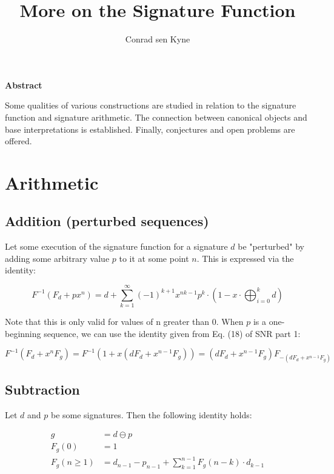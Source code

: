 \documentclass{article}
\title{\Large More on the Signature Function}
\author{Conrad sen Kyne}
\date{}
\begin{document}
\maketitle

\begin{center}
\textbf{Abstract}
\end{center}

\noindent Some qualities of various constructions are studied in relation to the signature function and signature arithmetic. The connection between canonical objects and base interpretations is established. Finally, conjectures and open problems are offered.

\tableofcontents

\pagebreak

\section{Arithmetic}

\subsection{Addition (perturbed sequences)}

Let some execution of the signature function for a signature $d$ be "perturbed" by adding some arbitrary value $p$ to it at some point $n$. This is expressed via the identity:

$$F^{-1} (F_d + px^n) = d + \sum_{k=1}^{\infty} (-1)^{k+1} x^{nk - 1} p^k \cdot \left( 1 - x \cdot \bigoplus_{i=0}^{k} d \right)$$

\noindent Note that this is only valid for values of n greater than 0. When $p$ is a one-beginning sequence, we can use the identity given from Eq. (18) of SNR part 1:

$$F^{-1} (F_d + x^n F_g) = F^{-1} \left(1 + x(dF_d + x^{n-1} F_g) \right) = (dF_d + x^{n-1} F_g) F_{-(dF_d + x^{n-1} F_g)}$$

\subsection{Subtraction}

Let $d$ and $p$ be some signatures. Then the following identity holds:

\begin{align*}
g &= d \ominus p\\
F_g(0) &= 1\\
F_g(n \geq 1) &= d_{n-1} - p_{n-1} + \sum_{k=1}^{n-1} F_g(n-k) \cdot d_{k-1}\\
\end{align*}
\end{document}
